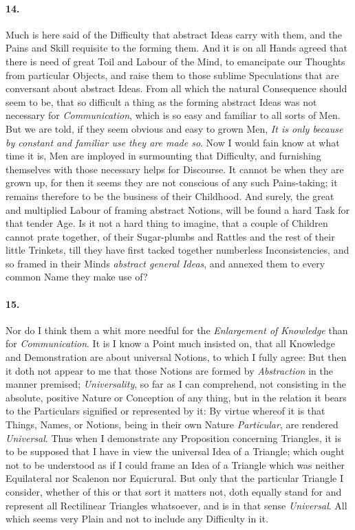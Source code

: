 \documentclass[]{article}
\newenvironment{sectionbody}{}{}
\begin{document}
\begin{sectionbody}
\paragraph{14.} Much is here said of the Difficulty that abstract Ideas carry
with them, and the Pains and Skill requisite to the forming them.
And it is on all Hands agreed that there is need of great Toil
and Labour of the Mind, to emancipate our Thoughts from
particular Objects, and raise them to those sublime Speculations
that are conversant about abstract Ideas.  From all which the
natural Consequence should seem to be, that so difficult a thing
as the forming abstract Ideas was not necessary for
\emph{Communication}, which is so easy and familiar to all
sorts of Men.  But we are told, if they seem obvious and easy to
grown Men, \emph{It is only because by constant and familiar use
they are made so}.  Now I would fain know at what time it is,
Men are imployed in surmounting that Difficulty, and furnishing
themselves with those necessary helps for Discourse.  It cannot
be when they are grown up, for then it seems they are not
conscious of any such Pains-taking; it remains therefore to be
the business of their Childhood.  And surely, the great and
multiplied Labour of framing abstract Notions, will be found a
hard Task for that tender Age.  Is it not a hard thing to
imagine, that a couple of Children cannot prate together, of
their Sugar-plumbs and Rattles and the rest of their little
Trinkets, till they have first tacked together numberless
Inconsistencies, and so framed in their Minds \emph{abstract
general Ideas}, and annexed them to every common Name they
make use of?



\paragraph{15.} Nor do I think them a whit more needful for the \emph{Enlargement
of Knowledge} than for \emph{Communication}.  It is I know
a Point much insisted on, that all Knowledge and Demonstration
are about universal Notions, to which I fully agree: But then it
doth not appear to me that those Notions are formed by
\emph{Abstraction} in the manner premised;
\emph{Universality}, so far as I can comprehend, not consisting
in the absolute, positive Nature or Conception of any thing, but
in the relation it bears to the Particulars signified or
represented by it: By virtue whereof it is that Things, Names, or
Notions, being in their own Nature \emph{Particular}, are
rendered \emph{Universal}.  Thus when I demonstrate any
Proposition concerning Triangles, it is to be supposed that I
have in view the universal Idea of a Triangle; which ought not to
be understood as if I could frame an Idea of a Triangle which was
neither Equilateral nor Scalenon nor Equicrural.  But only that
the particular Triangle I consider, whether of this or that sort
it matters not, doth equally stand for and represent all
Rectilinear Triangles whatsoever, and is in that sense
\emph{Universal}.  All which seems very Plain and not to
include any Difficulty in it.




\end{sectionbody}
\end{document}
